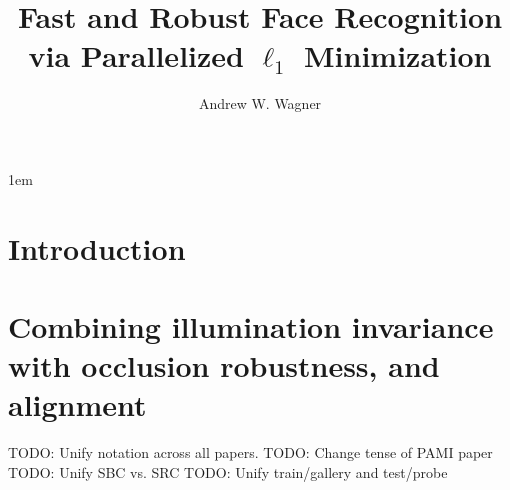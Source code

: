 \documentclass[draftthesis,tocnosub,noragright,centerchapter,12pt]{uiucecethesis09}
\title{Fast and Robust Face Recognition \\
		via Parallelized $\ell_1$ Minimization}
\author{Andrew W. Wagner}
\begin{document}

\maketitle

\parindent 1em%

\frontmatter

% 


%

\tableofcontents





\mainmatter

\chapter{Introduction}
\label{chap:introduction}
%

\chapter{Combining illumination invariance with occlusion robustness, and alignment}
TODO: Unify notation across all papers.
TODO: Change tense of PAMI paper
TODO: Unify SBC vs. SRC
TODO: Unify train/gallery and test/probe
\label{chap:cvpr}

\end{document}
